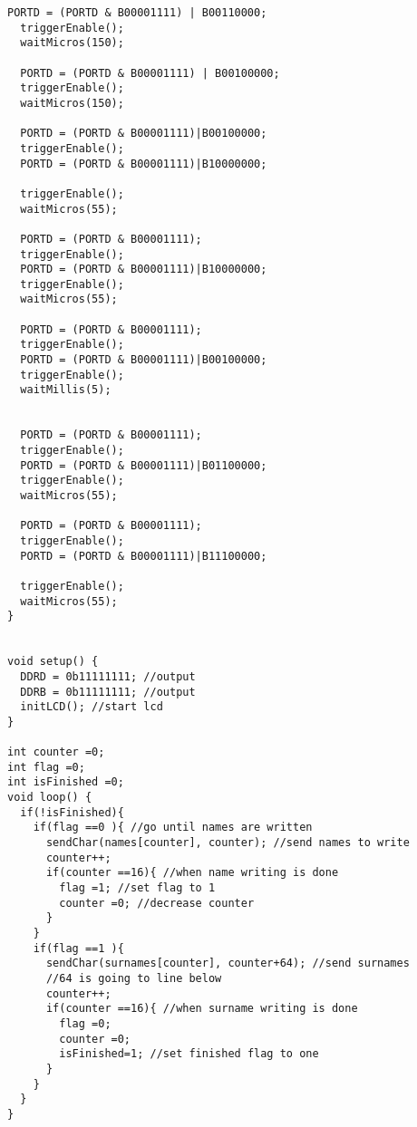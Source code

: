 \documentclass[pdftex,12pt,a4paper]{article}
\begin{document}
\begin{flushleft}
\begin{lstlisting}[language=Arduino]
  PORTD = (PORTD & B00001111) | B00110000;
  triggerEnable();
  waitMicros(150);

  PORTD = (PORTD & B00001111) | B00100000;
  triggerEnable();
  waitMicros(150);

  PORTD = (PORTD & B00001111)|B00100000;
  triggerEnable();
  PORTD = (PORTD & B00001111)|B10000000;

  triggerEnable();
  waitMicros(55);

  PORTD = (PORTD & B00001111);
  triggerEnable();
  PORTD = (PORTD & B00001111)|B10000000;
  triggerEnable();
  waitMicros(55);

  PORTD = (PORTD & B00001111);
  triggerEnable();
  PORTD = (PORTD & B00001111)|B00100000;
  triggerEnable();
  waitMillis(5);


  PORTD = (PORTD & B00001111);
  triggerEnable();
  PORTD = (PORTD & B00001111)|B01100000;
  triggerEnable();
  waitMicros(55);

  PORTD = (PORTD & B00001111);
  triggerEnable();
  PORTD = (PORTD & B00001111)|B11100000;

  triggerEnable();
  waitMicros(55);
}


void setup() {
  DDRD = 0b11111111; //output
  DDRB = 0b11111111; //output
  initLCD(); //start lcd
}

int counter =0;
int flag =0;
int isFinished =0;
void loop() {
  if(!isFinished){                         
    if(flag ==0 ){ //go until names are written
      sendChar(names[counter], counter); //send names to write
      counter++; 
      if(counter ==16){ //when name writing is done
        flag =1; //set flag to 1
        counter =0; //decrease counter
      } 
  	}
    if(flag ==1 ){
      sendChar(surnames[counter], counter+64); //send surnames
      //64 is going to line below
      counter++;
      if(counter ==16){ //when surname writing is done
        flag =0;
        counter =0;
        isFinished=1; //set finished flag to one
      } 
  	}
  }
}
\end{lstlisting}

\end{flushleft}
\end{document}
